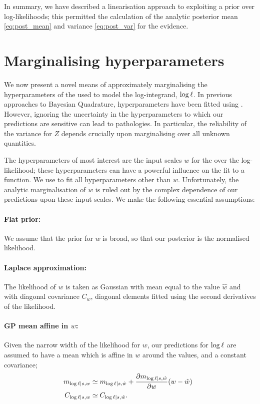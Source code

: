 \documentclass{article}
\begin{document}
In summary, we have described a linearisation approach to exploiting a  prior over log-likelihoods; this permitted the calculation of the analytic posterior mean \eqref{eq:post_mean} and variance \eqref{eq:post_var} for the evidence. 

\section{Marginalising hyperparameters}
\label{sec:marginalising}

We now present a novel means of approximately marginalising the hyperparameters of the \gpb used to model the log-integrand, $\tr$. In previous approaches to Bayesian Quadrature, hyperparameters have been fitted using 
 . However, ignoring the uncertainty in the hyperparameters to which our predictions are sensitive can lead to pathologies. In particular, the reliability of the variance for $Z$ depends crucially upon marginalising over all unknown quantities. 

The hyperparameters of most interest are the input scales $w$ for the \gpb over the log-likelihood; these hyperparameters can have a powerful influence on the fit to a function. We use  to fit all hyperparameters other than $w$. Unfortunately, the analytic marginalisation of $w$ is ruled out by the complex dependence of our predictions upon these input scales. 
We make the following essential assumptions:

 \paragraph*{Flat prior:} We assume that the prior for $w$ is broad, so that our posterior is the normalised likelihood. 
\paragraph*{Laplace approximation:} The likelihood of $w$ is taken as Gaussian with mean equal to the  value $\hat{w}$ and with diagonal covariance $C_w$, diagonal elements fitted using the second derivatives of the likelihood.
\paragraph*{GP mean affine in $w$:} Given the narrow width of the likelihood for $w$, our predictions for $\tr$ are assumed to have a \gpb mean which is affine in $w$ around the  values, and a constant covariance;
\begin{align}
\hspace{-0.2cm} m_{\tr|s,w} & \simeq m_{\tr|s,\hat{w}} 
 + \pderiv{m_{\tr|s,\hat{w}}}{w} (w- \hat{w})\\
 \hspace{-0.2cm} C_{\tr|s, w} & \simeq C_{\tr|s, \hat{w}}.
\end{align}
 
\end{document}

